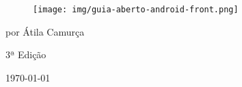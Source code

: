 \documentclass[a4paper,11pt]{book}
\begin{document}

\frontmatter

\pagebreak
\thispagestyle{empty}

\begin{figure}[h]
\centering
\texttt{[image: img/guia-aberto-android-front.png]}
\end{figure}

\begin{flushright}
%
%
%

{\huge
por Átila Camurça
}

\vspace{1in}

{\Large 3ª Edição}

\vspace{0.2in}

{\small \today}

\vfill
\end{flushright}

\clearpage

\tableofcontents
\listoflistings
\listoftables
\listoffigures
\end{document}
